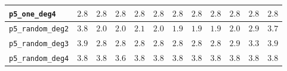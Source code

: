 \begin{landscape}
\begin{table}[H]
{\begin{tabular}{lccccccccccc}
\hline
\texttt{p5\_one\_deg4} & \textbf{$2.8$} & \textbf{$2.8$} & \textbf{$2.8$} & \textbf{$2.8$} & \textbf{$2.8$} & \textbf{$2.8$} & \textbf{$2.8$} & \textbf{$2.8$} & \textbf{$2.8$} & \textbf{$2.8$} & \textbf{$2.8$} \\
\hline
\texttt{p5\_random\_deg2} & $3.8$ & $2.0$ & $2.0$ & $2.1$ & $2.0$ & $1.9$ & \textbf{$1.9$} & $1.9$ & $2.0$ & $2.9$ & $3.7$ \\
\hline
\texttt{p5\_random\_deg3} & $3.9$ & $2.8$ & \textbf{$2.8$} & $2.8$ & $2.8$ & $2.8$ & $2.8$ & $2.8$ & $2.9$ & $3.3$ & $3.9$ \\
\hline
\texttt{p5\_random\_deg4} & $3.8$ & $3.8$ & \textbf{$3.6$} & $3.8$ & $3.8$ & $3.8$ & $3.8$ & $3.8$ & $3.8$ & $3.8$ & $3.8$ \\
\bottomrule
\end{tabular}
}%
\end{table}
\end{landscape}


